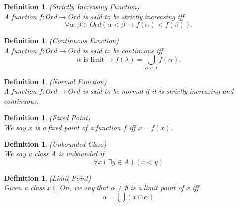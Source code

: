 \documentclass[12pt,a4paper]{article}
\newtheorem{definition}[theorem]{Definition}
\newcommand{\then}{\rightarrow}
\begin{document}
\begin{definition}{(Strictly Increasing Function)}\label{def:increasing_function}\\
A function $f: Ord \then Ord$ is said to be \emph{strictly increasing} iff
\begin{equation}
\forall \alpha, \beta \in Ord (\alpha < \beta \then f(\alpha) < f(\beta)).
\end{equation}
\end{definition}

\begin{definition}{(Continuous Function)}\label{def:continuous_function}\\
A function $f: Ord \then Ord$ is said to be \emph{continuous} iff
\begin{equation}
\alpha\mbox{ is limit} \then f(\lambda) = \bigcup_{\alpha < \lambda} f(\alpha).
\end{equation}
\end{definition}

\begin{definition}{(Normal Function)}\label{def:normal_function}\\
A function $f: Ord \then Ord$ is said to be \emph{normal} if it is \emph{strictly increasing} and \emph{continuous}.
\end{definition}

\begin{definition}{(Fixed Point)}\label{def:fixed_point}\\
We say $x$ is a fixed point of a function $f$ iff $x=f(x)$.
\end{definition}

\begin{definition}{(Unbounded Class)}\label{def:unbounded_class}\\
We say a class $A$ is unbounded if 
\begin{equation}
\forall x (\exists y \in A) (x < y)
\end{equation}
\end{definition}

\begin{definition}{(Limit Point)}\label{def:limit_point}\\
Given a class $x \subseteq On$, we say that $\alpha \neq \emptyset$ is a limit point of $x$ iff 
\begin{equation}
\alpha = \bigcup(x \cap \alpha)
\end{equation}
\end{definition}
\end{document}
